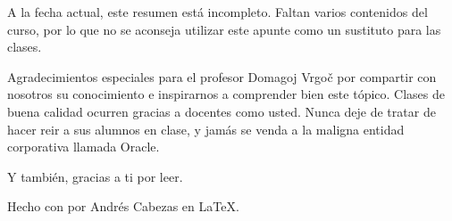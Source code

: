 A la fecha actual, este resumen est\'a incompleto. Faltan varios contenidos del curso, por lo que no se aconseja utilizar este apunte como un sustituto para las clases.

Agradecimientos especiales para el profesor Domagoj Vrgoč por compartir con nosotros su conocimiento e inspirarnos a comprender bien este t\'opico. Clases de buena calidad ocurren gracias a docentes como usted. Nunca deje de tratar de hacer reir a sus alumnos en clase, y jam\'as se venda a la maligna entidad corporativa llamada Oracle.

Y tambi\'en, gracias a ti por leer.

Hecho con \Heart{} por Andrés Cabezas en \LaTeX.